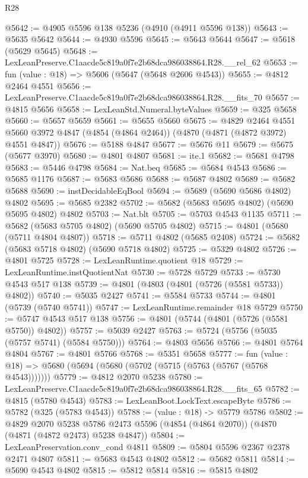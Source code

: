 \begin{lexlean}{R28}
\begin{coremodule}
@5642 := @4905 @5596 @138 @5236 (@4910 (@4911 @5596 @138))
@5643 := @5635 @5642
@5644 := @4930 @5596
@5645 := @5643 @5644
@5647 := @5618 (@5629 @5645)
@5648 := LexLeanPreserve.C1aacde5c819a0f7e2b68dca986038864.R28.__rel_62
@5653 := fun (value : @18) => @5606 (@5647 (@5648 @2606 @4543))
@5655 := @4812 @2464 @4551
@5656 := LexLeanPreserve.C1aacde5c819a0f7e2b68dca986038864.R28.__fits_70
@5657 := @4815 @5656
@5658 := LexLeanStd.Numeral.byteValues
@5659 := @325 @5658
@5660 := @5657 @5659
@5661 := @5655 @5660
@5675 := @4829
    @2464
    @4551
    @5660
    @3972
    @4847
    (@4854 (@4864 @2464))
    (@4870 (@4871 (@4872 @3972) @4551 @4847))
@5676 := @5188 @4847
@5677 := @5676 @11
@5679 := @5675 (@5677 @3970)
@5680 := @4801 @4807
@5681 := ite.{1}
@5682 := @5681 @4798
@5683 := @5446 @4798
@5684 := Nat.beq
@5685 := @5684 @4543
@5686 := @5685 @1176
@5687 := @5683 @5686
@5688 := @5687 @4802
@5689 := @5682 @5688
@5690 := instDecidableEqBool
@5694 := @5689 (@5690 @5686 @4802) @4802
@5695 := @5685 @2382
@5702 := @5682 (@5683 @5695 @4802) (@5690 @5695 @4802) @4802
@5703 := Nat.blt
@5705 := @5703 @4543 @1135
@5711 := @5682 (@5683 @5705 @4802) (@5690 @5705 @4802)
@5715 := @4801 (@5680 (@5711 @4804 @4807))
@5718 := @5711 @4802 (@5685 @2408)
@5724 := @5682 (@5683 @5718 @4802) (@5690 @5718 @4802)
@5725 := @5329 @4802
@5726 := @4801 @5725
@5728 := LexLeanRuntime.quotient @18
@5729 := LexLeanRuntime.instQuotientNat
@5730 := @5728 @5729
@5733 := @5730 @4543 @517 @138
@5739 := @4801 (@4803 (@4801 (@5726 (@5581 @5733)) @4802))
@5740 := @5035 @2427
@5741 := @5584 @5733
@5744 := @4801 (@5739 (@5740 @5741))
@5747 := LexLeanRuntime.remainder @18 @5729
@5750 := @5747 @4543 @517 @138
@5756 := @4801 (@5744 (@4801 (@5726 (@5581 @5750)) @4802))
@5757 := @5039 @2427
@5763 := @5724 (@5756 (@5035 (@5757 @5741) (@5584 @5750)))
@5764 := @4803 @5656
@5766 := @4801 @5764 @4804
@5767 := @4801 @5766
@5768 := @5351 @5658
@5777 := fun (value : @18) => @5680 (@5694 (@5680 (@5702 (@5715 (@5763 (@5767 (@5768 @4543)))))))
@5779 := @4812 @2070 @5238
@5780 := LexLeanPreserve.C1aacde5c819a0f7e2b68dca986038864.R28.__fits_65
@5782 := @4815 (@5780 @4543)
@5783 := LexLeanBoot.LockText.escapeByte
@5786 := @5782 (@325 (@5783 @4543))
@5788 := (value : @18) -> @5779 @5786
@5802 := @4829
    @2070
    @5238
    @5786
    @2473
    @5596
    (@4854 (@4864 @2070))
    (@4870 (@4871 (@4872 @2473) @5238 @4847))
@5804 := LexLeanPreservation.conv_cond @4811
@5809 := @5804 @5596 @2367 @2378 @2471 @4807
@5811 := @5683 @4543 @4802
@5812 := @5682 @5811
@5814 := @5690 @4543 @4802
@5815 := @5812 @5814
@5816 := @5815 @4802

\end{coremodule}
\end{lexlean}
